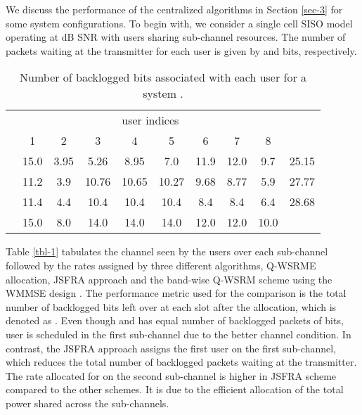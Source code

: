 We discuss the performance of the centralized algorithms in Section \ref{sec-3} for some system configurations. To begin with, we consider a single cell \ac{SISO} model operating at  dB \ac{SNR} with  users sharing  sub-channel resources. The number of packets waiting at the transmitter for each user is given by  and  bits, respectively. 
\begin{table}
	\centering
	\caption{Number of backlogged bits associated with each user for a system .}
	\renewcommand{\arraystretch}{1.25} \scriptsize
	\begin{tabular}{|c|*{8}{c}|c|}
		\hline
		\multirow{2}{*}{\me{q}} & \multicolumn{8}{c|}{user indices} & \multirow{2}{*}{\me{\chi}} \\
		\cline{2-9}
		& 1 & 2 & 3 & 4 & 5 & 6 & 7 & 8 & \\
		\hline
		\hline
		\me{1} & 15.0 & 3.95 & 5.26 & 8.95 & 7.0 & 11.9 & 12.0 & 9.7 & 25.15 \\
		\me{2} & 11.2 & 3.9 & 10.76 & 10.65 & 10.27 & 9.68 & 8.77 & 5.9 & 27.77 \\
		\me{\infty} & 11.4 & 4.4 & 10.4 & 10.4 & 10.4 & 8.4 &  8.4 &  6.4 & 28.68 \\
		\hline
		\me{Q_k}  & 15.0 &  8.0 &  14.0 & 14.0 &  14.0 & 12.0 & 12.0 & 10.0  \\
		\cline{1-9}
	\end{tabular}
	\label{tbl-3}
\end{table}

Table \ref{tbl-1} tabulates the channel seen by the users over each sub-channel followed by the rates assigned by three different algorithms, \ac{Q-WSRME} allocation, \ac{JSFRA} approach and the band-wise \ac{Q-WSRM} scheme using the \ac{WMMSE} design \cite{wmmse_shi}. The performance metric used for the comparison is the total number of backlogged bits left over at each slot after the allocation, which is denoted as . Even though  and  has equal number of backlogged packets of  bits, user  is scheduled in the first sub-channel due to the better channel condition. In contrast, the \ac{JSFRA} approach assigns the first user on the first sub-channel, which reduces the total number of backlogged packets waiting at the transmitter. The rate allocated for  on the second sub-channel is higher in \ac{JSFRA} scheme compared to the other schemes. It is due to the efficient allocation of the total power shared across the sub-channels.

